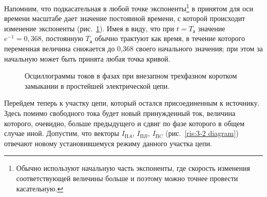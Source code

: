 \begin{small}
	Напомним, что подкасательная в любой точке экспоненты\footnote{Обычно используют начальную часть экспоненты, где скорость изменения соответствующей величины больше и поэтому можно точнее провести касательную.} в принятом для оси времени масштабе дает значение постоянной времени, с которой происходит изменение экспоненты (рис.~\ref{ris:3-3}). Имея в виду, что при $ t = T_{\text{а}} $ значение $ e^{-1} = 0,368 $, постоянную $ T_{\text{а}} $ обычно трактуют как время, в течение которого переменная величина снижается до 0,368 своего начального значения; при этом за начальную может быть принята любая точка кривой.
	
\end{small}

\begin{figure}
	\caption{Осциллограммы токов в фазах при внезапном трехфазном коротком замыкании в простейшей электрической цепи.}
	\label{ris:3-3}
\end{figure}

Перейдем теперь к участку цепи, который остался присоединенным к источнику. Здесь помимо свободного тока будет новый принужденный ток, величина которого, очевидно, больше предыдущего и сдвиг по фазе которого в общем случае иной. Допустим, что векторы $ I_{\text{П}A} $, $ I_{\text{П}B} $, $ I_{\text{П}C} $ (рис.~\ref{ris:3-2 diagram}) отвечают новому установившемуся режиму данного участка цепи.

